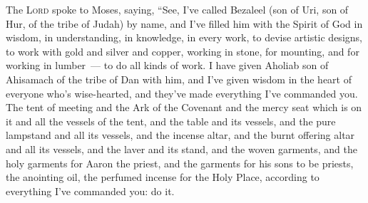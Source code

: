 
\begin{inparaenum}
   The \textsc{Lord} spoke to Moses, saying,%
   ``See, I've called Bezaleel (son of Uri, son of Hur, of the tribe of Judah) by name,%
   and I've filled him with the Spirit of God in wisdom, in understanding, in knowledge, in every work,%
   to devise artistic designs, to work with gold and silver and copper,%
   working in stone, for mounting, and for working in lumber~--- to do all kinds of work.%
   I have given Aholiab son of Ahisamach of the tribe of Dan with him, and I've given wisdom in the heart of everyone who's wise-hearted, and they've made everything I've commanded you.%
   The tent of meeting and the Ark of the Covenant and the mercy seat which is on it and all the vessels of the tent,%
   and the table and its vessels, and the pure lampstand and all its vessels, and the incense altar,%
   and the burnt offering altar and all its vessels, and the laver and its stand,%
   and the woven garments, and the holy garments for Aaron the priest, and the garments for his sons to be priests,%
   the anointing oil, the perfumed incense for the Holy Place, according to everything I've commanded you: do it.%
  

\end{inparaenum}

